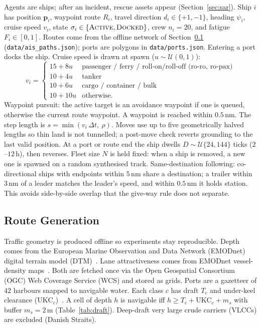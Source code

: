 \documentclass[cameraready]{Interspeech}
\begin{document}
Agents are ships; after an incident, rescue assets appear (Section~\ref{sec:sar}). Ship $i$ has position $\mathbf{p}_i$, waypoint route $R_i$, travel direction $d_i \in \{+1,-1\}$, heading $\psi_i$, cruise speed $v_i$, state $\sigma_i \in \{\textsc{Active}, \textsc{Docked}\}$, crew $n_i = 20$, and fatigue $F_i \in [0,1]$. Routes come from the offline network of Section~\ref{sec:routegen} (\texttt{data/ais\_paths.json}); ports are polygons in \texttt{data/ports.json}. Entering a port docks the ship. Cruise speed is drawn at spawn ($u \sim \mathcal{U}(0,1)$):
\begin{equation*}
  v_i =
  \begin{cases}
  15 + 8u & \text{passenger / ferry / roll-on/roll-off (ro-ro, ro-pax)}\\
  10 + 4u & \text{tanker}\\
  10 + 6u & \text{cargo / container / bulk}\\
  10 + 10u & \text{otherwise.}
  \end{cases}
\end{equation*}
Waypoint pursuit: the active target is an avoidance waypoint if one is queued, otherwise the current route waypoint. A waypoint is reached within $0.5$\,nm. The step length is $s = \min(v_i\,\Delta t,\ \rho)$. Moves use up to five geometrically halved lengths so thin land is not tunnelled; a post-move check reverts grounding to the last valid position. At a port or route end the ship dwells $D \sim \mathcal{U}\{24,144\}$ ticks ($2$--$12$\,h), then reverses. Fleet size $N$ is held fixed: when a ship is removed, a new one is spawned on a random synthesised track. Same-destination following: co-directional ships with endpoints within $5$\,nm share a destination; a trailer within $3$\,nm of a leader matches the leader's speed, and within $0.5$\,nm it holds station. This avoids side-by-side overlap that the give-way rule does not separate.


\subsection{Route Generation}
\label{sec:routegen}

Traffic geometry is produced offline so experiments stay reproducible. Depth comes from the European Marine Observation and Data Network (EMODnet) digital terrain model (DTM)~\cite{emodnetbathymetry}. Lane attractiveness comes from EMODnet vessel-density maps~\cite{emodnetvesseldensity,silveira2013}. Both are fetched once via the Open Geospatial Consortium (OGC) Web Coverage Service (WCS) and stored as grids. Ports are a gazetteer of $42$ harbours snapped to navigable water. Each class $c$ has draft $T_c$ and under-keel clearance ($\text{UKC}_c$)~\cite{pianc2014}. A cell of depth $h$ is navigable iff $h \ge T_c + \text{UKC}_c + m_s$ with buffer $m_s = 2$\,m (Table~\ref{tab:draft}). Deep-draft very large crude carriers (VLCCs) are excluded (Danish Straits).
\end{document}
